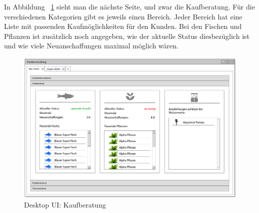In Abbildung ~\ref{desktopUI:3} sieht man die nächste Seite, und zwar die Kaufberatung. Für die verschiedenen Kategorien gibt es jeweils einen Bereich. Jeder Bereich hat eine Liste mit passenden Kaufmöglichkeiten für den Kunden. Bei den Fischen und Pflanzen ist zusätzlich noch angegeben, wie der aktuelle Status diesbezüglich ist und wie viele Neuanschaffungen maximal möglich wären.

\begin{figure}[ht!]
\centering
\includegraphics[width=\linewidth]{3Kaufberatung}
\caption{Desktop UI: Kaufberatung}
\label{desktopUI:3}
\end{figure}
